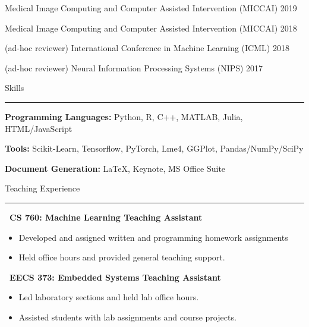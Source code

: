\documentclass[]{article}
\begin{document}
\noindent Medical Image Computing and Computer Assisted Intervention (MICCAI) \hfill 2019

\noindent Medical Image Computing and Computer Assisted Intervention (MICCAI) \hfill 2018

\noindent (ad-hoc reviewer) International Conference in Machine Learning (ICML) \hfill 2018

\noindent (ad-hoc reviewer) Neural Information Processing Systems (NIPS) \hfill 2017

\vspace{20pt}
{\LARGE Skills}
\vspace{5pt}
\hrule
\vspace{10pt}

\noindent \textbf{Programming Languages:} Python, R, C++, MATLAB, Julia, HTML/JavaScript

\noindent \textbf{Tools:} Scikit-Learn, Tensorflow, PyTorch, Lme4, GGPlot, Pandas/NumPy/SciPy

\noindent \textbf{Document Generation:} \LaTeX, Keynote, MS Office Suite


\iffalse
\vspace{5pt}
{\LARGE Teaching Experience}
\vspace{3pt}
\hrule
\vspace{5pt}

 \newline
	{\bf \ CS 760: Machine Learning Teaching Assistant}
	\begin{itemize}[label={$\bullet$}]
		\item Developed and assigned written and programming homework assignments
		\item Held office hours and provided general teaching support.
	\end{itemize} 

 \newline
	{\bf \ EECS 373: Embedded Systems Teaching Assistant}
	\begin{itemize}[label={$\bullet$}]
		\item Led laboratory sections and held lab office hours.
		\item Assisted students with lab assignments and course projects.
	\end{itemize}
\end{document}
